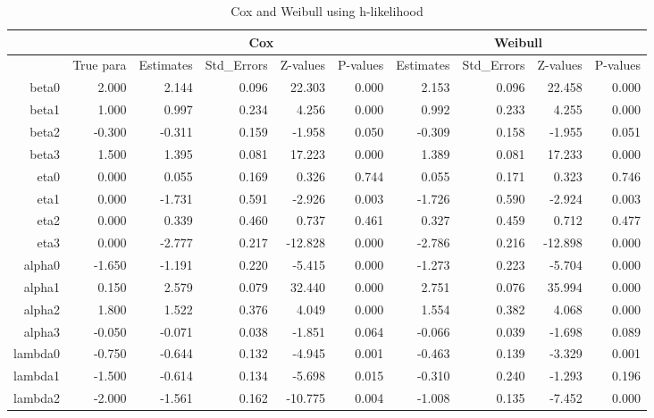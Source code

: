 
\begin{table}[ht]
\centering
\caption{Cox and Weibull using h-likelihood}
\begin{tabular}{rr|rrrr|rrrr}
  \hline
   & & \multicolumn{4}{c|}{Cox} &  \multicolumn{4}{c}{Weibull} \\
  \hline
   & True para & Estimates & Std\_Errors & Z-values & P-values & Estimates & Std\_Errors & Z-values & P-values \\ 
  \hline
  beta0 & 2.000 & 2.144 & 0.096 & 22.303 & 0.000 & 2.153 & 0.096 & 22.458 & 0.000 \\ 
  beta1 & 1.000 & 0.997 & 0.234 & 4.256 & 0.000 & 0.992 & 0.233 & 4.255 & 0.000 \\ 
  beta2 & -0.300 & -0.311 & 0.159 & -1.958 & 0.050 & -0.309 & 0.158 & -1.955 & 0.051 \\ 
  beta3 & 1.500 & 1.395 & 0.081 & 17.223 & 0.000 & 1.389 & 0.081 & 17.233 & 0.000 \\ 
  eta0 & 0.000 & 0.055 & 0.169 & 0.326 & 0.744 & 0.055 & 0.171 & 0.323 & 0.746 \\ 
  eta1 & 0.000 & -1.731 & 0.591 & -2.926 & 0.003 & -1.726 & 0.590 & -2.924 & 0.003 \\ 
  eta2 & 0.000 & 0.339 & 0.460 & 0.737 & 0.461 & 0.327 & 0.459 & 0.712 & 0.477 \\ 
  eta3 & 0.000 & -2.777 & 0.217 & -12.828 & 0.000 & -2.786 & 0.216 & -12.898 & 0.000 \\ 
  alpha0 & -1.650 & -1.191 & 0.220 & -5.415 & 0.000 & -1.273 & 0.223 & -5.704 & 0.000 \\ 
  alpha1 & 0.150 & 2.579 & 0.079 & 32.440 & 0.000 & 2.751 & 0.076 & 35.994 & 0.000 \\ 
  alpha2 & 1.800 & 1.522 & 0.376 & 4.049 & 0.000 & 1.554 & 0.382 & 4.068 & 0.000 \\ 
  alpha3 & -0.050 & -0.071 & 0.038 & -1.851 & 0.064 & -0.066 & 0.039 & -1.698 & 0.089 \\ 
  lambda0 & -0.750 & -0.644 & 0.132 & -4.945 & 0.001 & -0.463 & 0.139 & -3.329 & 0.001 \\ 
  lambda1 & -1.500 & -0.614 & 0.134 & -5.698 & 0.015 & -0.310 & 0.240 & -1.293 & 0.196 \\ 
  lambda2 & -2.000 & -1.561 & 0.162 & -10.775 & 0.004 & -1.008 & 0.135 & -7.452 & 0.000 \\ 
   \hline
\end{tabular}
\end{table}



